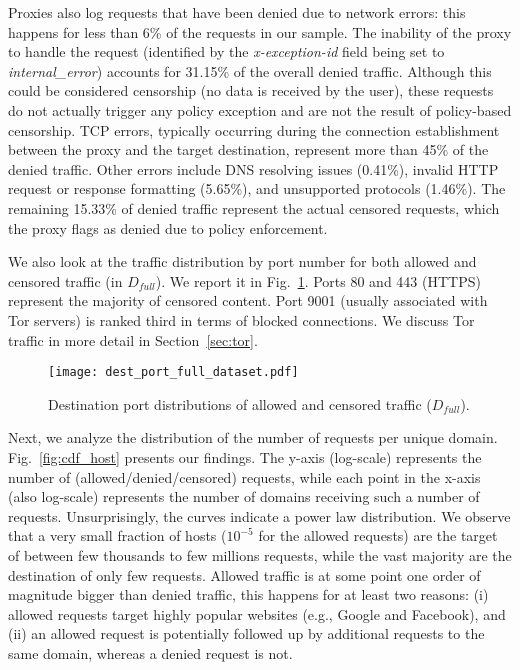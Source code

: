 \documentclass{sig-alternate-2013}
\newcommand{\descr}[1]{\smallskip\noindent{\bf #1}}
\def\df{$D_{full}$\xspace}
\begin{document}
\descr{Denied traffic.}
Proxies also log requests that have been denied due to network errors: this happens for less than 6\% of the requests in our sample.
The inability of the proxy to handle the request (identified by the {\em x-exception-id} field being set to \emph{internal\_error}) accounts for 31.15\% of the overall denied traffic. Although this could be considered  censorship (no data is received by the user), these requests do not actually trigger any policy exception and are not the result of policy-based censorship. TCP errors, typically occurring during the connection establishment between the proxy and the target destination, represent more than 45\% of the denied traffic.  Other errors include DNS resolving issues (0.41\%), invalid HTTP request or response formatting (5.65\%), and unsupported protocols (1.46\%). The remaining 15.33\% of denied traffic represent the actual censored requests, which the proxy flags as denied due to policy enforcement. 



\descr{Ports.} We also look at the traffic distribution by port number for both allowed and censored traffic (in \df). We report it in Fig.~\ref{fig:port_distribution_sample}. Ports 80 and 443 (HTTPS) represent the majority of censored content. Port 9001 (usually associated with Tor servers) is ranked third in terms of blocked connections. We discuss Tor traffic in more detail in Section~\ref{sec:tor}.


\begin{figure}[t!]
\begin{center}
\texttt{[image: dest\_port\_full\_dataset.pdf]}
\vspace{-0.15cm}
\caption{Destination port distributions of allowed and censored traffic ($D_{full}$).}
\label{fig:port_distribution_sample}
\end{center}
\end{figure} 





\descr{Domains.} Next, we analyze the distribution of the number of requests per unique domain. 
Fig.~\ref{fig:cdf_host} presents our findings. The y-axis (log-scale) represents the number of (allowed/denied/censored) requests, while each point in the x-axis (also log-scale) represents the number of domains receiving such a number of requests. Unsurprisingly, the curves indicate a power law distribution.  We observe that a very small fraction of hosts ($10^{-5}$ for the allowed requests) are the target of between few thousands to few millions requests, while the vast majority are the destination of only few requests. Allowed traffic is at some point one order of magnitude bigger than denied traffic, this happens for at least two reasons: (i) allowed requests target highly popular websites (e.g., Google and Facebook), and  (ii) an allowed request is potentially followed up by additional requests to the same domain, whereas a denied request is not.
\end{document}
